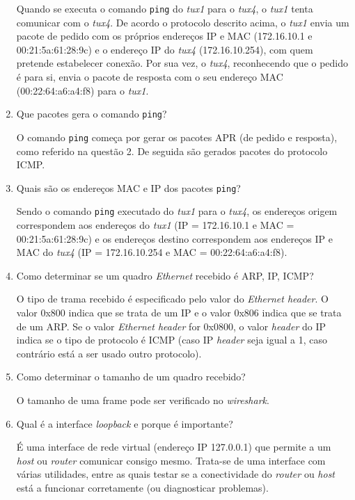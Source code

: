 \documentclass{article}
\begin{document}
\begin{enumerate}
Quando se executa o comando \texttt{ping} do \textit{tux1} para o \textit{tux4}, o \textit{tux1} tenta comunicar com o \textit{tux4}. De acordo o protocolo descrito acima, o \textit{tux1} envia um pacote de pedido com os próprios endereços IP e MAC (172.16.10.1 e 00:21:5a:61:28:9c) e o endereço IP do \textit{tux4} (172.16.10.254), com quem pretende estabelecer conexão. Por sua vez, o \textit{tux4}, reconhecendo que o pedido é para si, envia o pacote de resposta com o seu endereço MAC (00:22:64:a6:a4:f8) para o \textit{tux1}.


\item Que pacotes gera o comando \texttt{ping}?

O comando \texttt{ping} começa por gerar os pacotes APR (de pedido e resposta), como referido na questão 2. De seguida são gerados pacotes do protocolo ICMP.

\item Quais são os endereços MAC e IP dos pacotes \texttt{ping}?

Sendo o comando \texttt{ping} executado do \textit{tux1} para o \textit{tux4}, os endereços origem correspondem aos endereços do \textit{tux1} (IP = 172.16.10.1 e MAC = 00:21:5a:61:28:9c) e os endereços destino correspondem aos endereços IP e MAC do \textit{tux4} (IP = 172.16.10.254 e MAC = 00:22:64:a6:a4:f8).

\item Como determinar se um quadro \textit{Ethernet} recebido é ARP, IP, ICMP?

O tipo de trama recebido é especificado pelo valor do \textit{Ethernet header}. O valor 0x800 indica que se trata de um IP e o valor 0x806 indica que se trata de um ARP.
Se o valor \textit{Ethernet header} for 0x0800, o valor \textit{header} do IP indica se o tipo de protocolo é ICMP (caso IP \textit{header} seja igual a 1, caso contrário está a ser usado outro protocolo).

\item Como determinar o tamanho de um quadro recebido?

O tamanho de uma frame pode ser verificado no \textit{wireshark}.

\item Qual é a interface \textit{loopback} e porque é importante?

É uma interface de rede virtual (endereço IP 127.0.0.1) que permite a um \textit{host} ou \textit{router} comunicar consigo mesmo. Trata-se de uma interface com várias utilidades, entre as quais testar se a conectividade do \textit{router} ou \textit{host} está a funcionar corretamente (ou diagnosticar problemas).
\end{enumerate}
\end{document}
